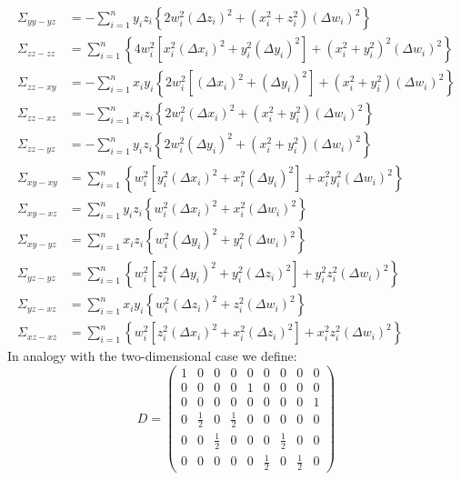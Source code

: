 \documentclass[a4paper,11pt]{article}
\begin{document}
\begin{align}
  \Sigma_{yy-yz} &= -\sum_{i=1}^n y_iz_i \left\{
  2w_i^2 (\Delta z_i)^2 + (x_i^2 + z_i^2)(\Delta w_i)^2
  \right\}\\
  \Sigma_{zz-zz} &= \sum_{i=1}^n \left\{
  4w_i^2 \left[ x_i^2(\Delta x_i)^2 + y_i^2(\Delta y_i)^2 \right] +
  \left(x_i^2 + y_i^2\right)^2(\Delta w_i)^2
  \right\}\\
  \Sigma_{zz-xy} &= -\sum_{i=1}^n x_iy_i \left\{
  2w_i^2 \left[ (\Delta x_i)^2 + (\Delta y_i)^2 \right] +
  (x_i^2 + y_i^2)(\Delta w_i)^2
  \right\}\\
  \Sigma_{zz-xz} &= -\sum_{i=1}^n x_iz_i \left\{
  2w_i^2 (\Delta x_i)^2 + (x_i^2 + y_i^2)(\Delta w_i)^2
  \right\}\\
  \Sigma_{zz-yz} &= -\sum_{i=1}^n y_iz_i \left\{
  2w_i^2 (\Delta y_i)^2 + (x_i^2 + y_i^2)(\Delta w_i)^2
  \right\}\\
  \Sigma_{xy-xy} &= \sum_{i=1}^n \left\{
  w_i^2 \left[ y_i^2 (\Delta x_i)^2 + x_i^2 (\Delta y_i)^2 \right] +
  x_i^2y_i^2 (\Delta w_i)^2
  \right\}\\
  \Sigma_{xy-xz} &= \sum_{i=1}^n y_iz_i \left\{
  w_i^2 (\Delta x_i)^2 + x_i^2 (\Delta w_i)^2
  \right\}\\
  \Sigma_{xy-yz} &= \sum_{i=1}^n x_iz_i \left\{
  w_i^2 (\Delta y_i)^2 + y_i^2 (\Delta w_i)^2
  \right\}\\
  \Sigma_{yz-yz} &= \sum_{i=1}^n \left\{
  w_i^2 \left[ z_i^2 (\Delta y_i)^2 + y_i^2 (\Delta z_i)^2 \right] +
  y_i^2z_i^2 (\Delta w_i)^2
  \right\}\\
  \Sigma_{yz-xz} &= \sum_{i=1}^n x_iy_i \left\{
  w_i^2 (\Delta z_i)^2 + z_i^2 (\Delta w_i)^2
  \right\}\\
  \Sigma_{xz-xz} &= \sum_{i=1}^n \left\{
  w_i^2 \left[ z_i^2 (\Delta x_i)^2 + x_i^2 (\Delta z_i)^2 \right] +
  x_i^2z_i^2 (\Delta w_i)^2
  \right\}
\end{align}
In analogy with the two-dimensional case we define:
\begin{equation}
  D = 
  \begin{pmatrix}
    1 & 0 & 0 & 0 & 0 & 0 & 0 & 0 & 0\\
    0 & 0 & 0 & 0 & 1 & 0 & 0 & 0 & 0\\
    0 & 0 & 0 & 0 & 0 & 0 & 0 & 0 & 1\\
    0 & \frac{1}{2} & 0 & \frac{1}{2} & 0 & 0 & 0 & 0 & 0\\
    0 & 0 & \frac{1}{2} & 0 & 0 & 0 & \frac{1}{2} & 0 & 0\\
    0 & 0 & 0 & 0 & 0 & \frac{1}{2} & 0 & \frac{1}{2} & 0
  \end{pmatrix}
\end{equation}
\end{document}
